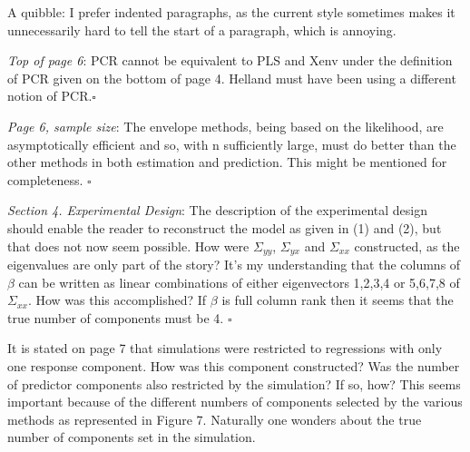 \documentclass[11pt, a4paper]{article}
\begin{document}
A quibble: I prefer indented paragraphs, as the current style sometimes makes it unnecessarily hard to tell the start of a paragraph, which is annoying.

\textit{Top of page 6}: PCR cannot be equivalent to PLS and Xenv under the
definition of PCR given on the bottom of page 4. Helland must have been using a
different notion of PCR.$\square$

\textit{Page 6, sample size}: The envelope methods, being based on the likelihood, are asymptotically efficient and so, with n sufficiently large, must do better than the other methods in both estimation and prediction. This might be mentioned for completeness. 
$\square$

\textit{Section 4. Experimental Design}: The description of the experimental design should enable the reader to reconstruct the model as given in (1) and (2), but that does not now seem
possible. How were $\Sigma_{yy}$, $\Sigma_{yx}$ and $\Sigma_{xx}$ constructed, as the eigenvalues are only part of the story? It’s my understanding that the columns of $\beta$ can be written as linear combinations of either eigenvectors 1,2,3,4 or 5,6,7,8 of $\Sigma_{xx}$. How was this accomplished? If $\beta$ is full column rank then it seems that the true number of components must be 4.
$\square$

It is stated on page 7 that simulations were restricted to regressions with only one response component. How was this component constructed? Was the number of predictor components also restricted by the simulation? If so, how? This seems important because of the different numbers of components selected by the various methods as represented in Figure 7. Naturally one wonders about the true number of components set in the simulation.
\end{document}
